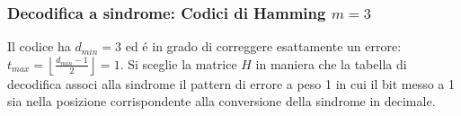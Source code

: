         \subsubsection{Decodifica a sindrome: Codici di Hamming $m=3$}
            \begin{sloppypar}
                Il codice ha $d_{min} = 3$ ed é in grado di correggere esattamente un errore: ${t_{max} = \left\lfloor \frac{d_{min}-1}{2}\right\rfloor = 1}$. Si sceglie la matrice $H$
                in maniera che la tabella di decodifica associ alla sindrome il pattern di errore a peso 1 in cui il bit
                messo a 1 sia nella posizione corrispondente alla conversione della sindrome in decimale.
            \end{sloppypar}
            \begin{table}[H]
                \hfill
            \end{table}

